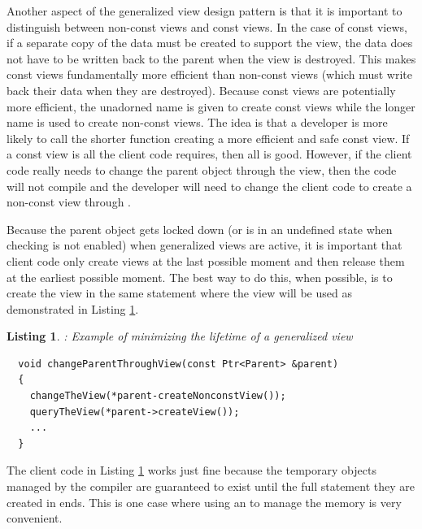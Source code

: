 \documentclass[pdf,ps2pdf,11pt]{SANDreport}
\newtheorem{listing}{Listing}
\begin{document}
Another aspect of the generalized view design pattern is that it is
important to distinguish between non-const views and const views.  In
the case of const views, if a separate copy of the data must be
created to support the view, the data does not have to be written back
to the parent when the view is destroyed.  This makes const views
fundamentally more efficient than non-const views (which must write
back their data when they are destroyed).  Because const views are
potentially more efficient, the unadorned name {} 
is given to create const views while the longer name
{} is used to create non-const views.
The idea is that a developer is more likely to call the shorter
{} function creating a more efficient and safe
const view.  If a const view is all the client code requires, then all
is good.  However, if the client code really needs to change the
parent object through the view, then the code will not compile and the
developer will need to change the client code to create a non-const
view through {}.

Because the parent object gets locked down (or is in an undefined
state when checking is not enabled) when generalized views are active,
it is important that client code only create views at the last
possible moment and then release them at the earliest possible moment.
The best way to do this, when possible, is to create the view in the
same statement where the view will be used as demonstrated in Listing
{}\ref{listing:generalized-view-min-lifetime}.


\begin{listing}:  Example of minimizing the lifetime of a generalized
view  \\
\label{listing:generalized-view-min-lifetime}
{\small\begin{verbatim}
  void changeParentThroughView(const Ptr<Parent> &parent)
  {
    changeTheView(*parent-createNonconstView());
    queryTheView(*parent->createView());
    ...
  }
\end{verbatim}}
\end{listing}


The client code in Listing
{}\ref{listing:generalized-view-min-lifetime} works just fine because
the temporary {} objects managed by the
compiler are guaranteed to exist until the full statement they are
created in ends.  This is one case where using an {} to
manage the memory is very convenient.
\end{document}
